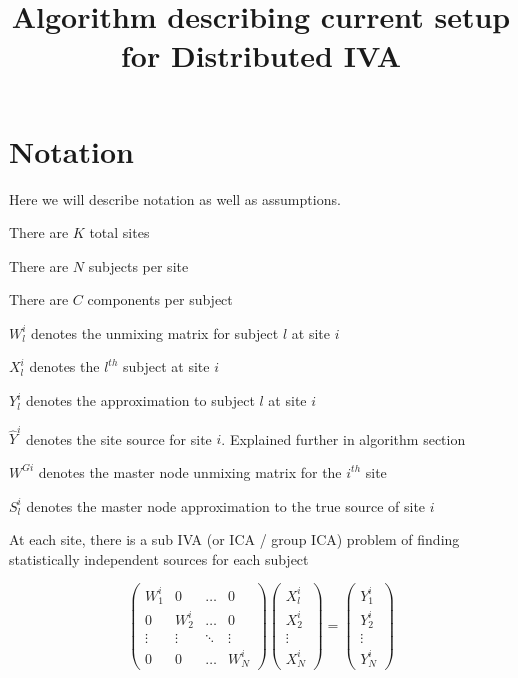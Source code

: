 \documentclass{amsproc}
\title{Algorithm describing current setup for Distributed IVA}
\begin{document}
\maketitle

\section{Notation} Here we will describe notation as well as assumptions.

There are $K$ total sites

There are $N$ subjects per site

There are $C$ components per subject

$W^i_l$ denotes the unmixing matrix for subject $l$ at site $i$

$X^i_l$ denotes the $l^{th}$ subject at site $i$

$Y^i_l$ denotes the approximation to subject $l$ at site $i$

$\hat{Y}^i$ denotes the site source for site $i$. Explained further in algorithm section

$W^{Gi}$ denotes the master node unmixing matrix for the $i^{th}$ site

$S^i_l$ denotes the master node approximation to the true source of site $i$



At each site, there is a sub IVA (or ICA / group ICA) problem of finding statistically independent sources for each subject

\[
    \begin{pmatrix}
        W^i_1   & 0         & \dots     & 0         \\
        0       & W^i_2     & \dots     & 0         \\
        \vdots  & \vdots    & \ddots    & \vdots    \\
        0       & 0         & \dots     & W^i_N
    \end{pmatrix}
    \begin{pmatrix}
        X^i_l   \\
        X^i_2   \\
        \vdots  \\
        X^i_N
    \end{pmatrix}
    =
    \begin{pmatrix}
        Y^i_1   \\
        Y^i_2   \\
        \vdots  \\
        Y^i_N
    \end{pmatrix}
\]
\end{document}
